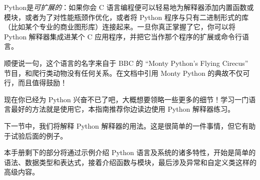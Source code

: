 Python是\emph{可扩展的}：如果你会 C 语言编程便可以轻易地为解释器添加内置函数或模块，或者为了对性能瓶颈作优化，或者将 Python 程序与只有二进制形式的库（比如某个专业的商业图形库）连接起来。一旦你真正掌握了它，你可以将 Python 解释器集成进某个 C 应用程序，并把它当作那个程序的扩展或命令行语言。

顺便说一句，这个语言的名字来自于 BBC 的 “Monty Python's Flying Cirecus” 节目，和爬行类动物没有任何关系。在文档中引用 Monty Python 的典故不仅可行，而且值得鼓励！

现在你已经为 Python 兴奋不已了吧，大概想要领略一些更多的细节！学习一门语言最好的方法就是使用它，本指南推荐你边读边使用 Python 解释器练习。

下一节中，我们将解释 Python 解释器的用法。这是很简单的一件事情，但它有助于试验后面的例子。

本手册剩下的部分将通过示例介绍 Python 语言及系统的诸多特性，开始是简单的语法、数据类型和表达式，接着介绍函数与模块，最后涉及异常和自定义类这样的高级内容。